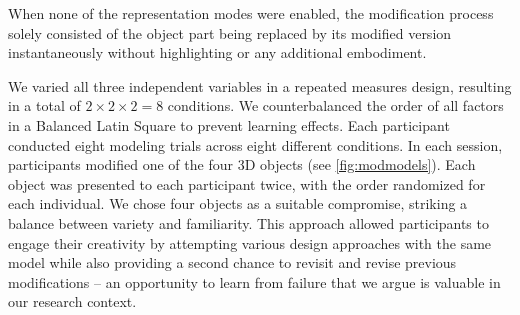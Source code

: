  \begin{table*}[t!]
    \caption{The list of questions participants were asked in the semi-structured interview.}
	\label{tab:interviewqs}
\end{table*}

When none of the representation modes were enabled, the modification process solely consisted of the object part being replaced by its modified version instantaneously without highlighting or any additional embodiment.

We varied all three independent variables in a repeated measures design, resulting in a total of $2 \times 2 \times 2 = 8$ conditions. %
We counterbalanced the order of all factors in a Balanced Latin Square to prevent learning effects.
Each participant conducted eight modeling trials across eight different conditions. In each session, participants modified one of the four 3D objects (see \autoref{fig:modmodels}). Each object was presented to each participant twice, with the order randomized for each individual. 
We chose four objects as a suitable compromise, striking a balance between variety and familiarity. 
This approach allowed participants to engage their creativity by attempting various design approaches with the same model while also providing a second chance to revisit and revise previous modifications – an opportunity to learn from failure that we argue is valuable in our research context.



